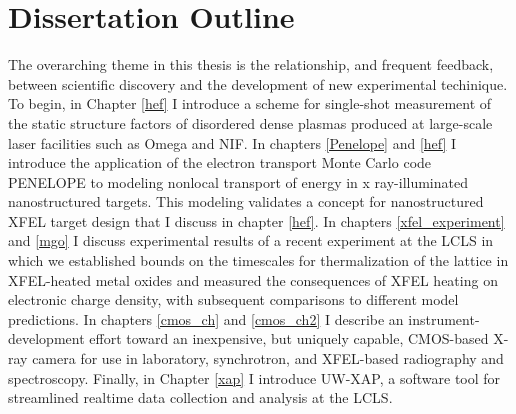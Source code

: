 \documentclass [11pt, proquest, article] {uwthesis}[2016/11/22]
\begin{document}
%





\section{Dissertation Outline}
The overarching theme in this thesis is the relationship, and frequent feedback, between scientific discovery and the development of new experimental techinique. To begin, in Chapter \ref{hef} I introduce a scheme for single-shot measurement of the static structure factors of disordered dense plasmas produced at large-scale laser facilities such as Omega and NIF. 
In chapters \ref{Penelope} and \ref{hef} I introduce the application of the electron transport Monte Carlo code PENELOPE to modeling nonlocal transport of energy in x ray-illuminated nanostructured targets. This modeling validates a concept for nanostructured XFEL target design that I discuss in chapter \ref{hef}.
In chapters \ref{xfel_experiment} and \ref{mgo} I discuss experimental results of a recent experiment at the LCLS in which we established bounds on the timescales for thermalization of the lattice in XFEL-heated metal oxides and measured the consequences of XFEL heating on electronic charge density, with subsequent comparisons to different model predictions.  In chapters \ref{cmos_ch} and \ref{cmos_ch2} I describe an instrument-development effort toward an inexpensive, but uniquely capable, CMOS-based X-ray camera for use in laboratory, synchrotron, and XFEL-based radiography and spectroscopy. Finally, in Chapter \ref{xap} I introduce UW-XAP, a software tool for streamlined realtime data collection and analysis at the LCLS. 
 
\end{document}
